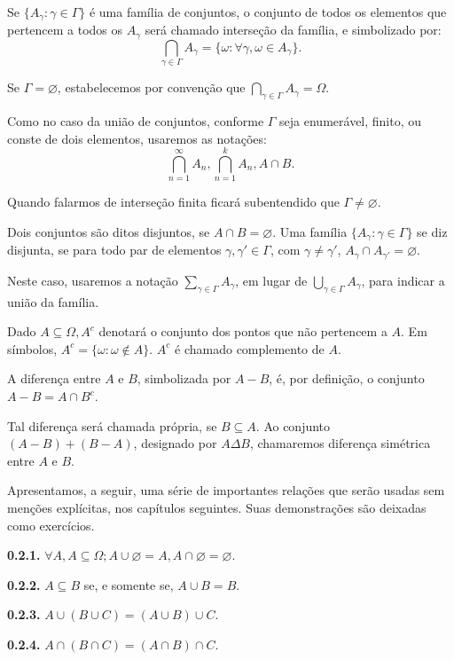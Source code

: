 \documentclass[
]{book}
\begin{document}
Se \(\{A_{\gamma}: \gamma \in \Gamma\}\) é uma família de conjuntos, o conjunto de todos os elementos que pertencem a todos os \(A_{\gamma}\) será chamado interseção da família, e simbolizado por: \[ \bigcap_{\gamma \in \Gamma} A_{\gamma} = \{\omega: \forall \gamma, \omega \in A_{\gamma}\}. \]

Se \(\Gamma = \varnothing\), estabelecemos por convenção que \(\bigcap\limits_{\gamma \in \Gamma} A_{\gamma} = \Omega\).

Como no caso da união de conjuntos, conforme \(\Gamma\) seja enumerável, finito, ou conste de dois elementos, usaremos as notações: \[\bigcap\limits_{n=1}^{\infty} A_n, \bigcap\limits_{n=1}^{k} A_n, A \cap B.\]

Quando falarmos de interseção finita ficará subentendido que \(\Gamma \neq \varnothing\).

Dois conjuntos são ditos disjuntos, se \(A \cap B = \varnothing\).
Uma família \(\{A_{\gamma}: \gamma \in \Gamma\}\) se diz disjunta, se para todo par de elementos \(\gamma, \gamma' \in \Gamma\), com \(\gamma \neq \gamma'\), \(A_{\gamma} \cap A_{\gamma'} = \varnothing\).

Neste caso, usaremos a notação \(\sum\limits_{\gamma \in \Gamma} A_{\gamma}\), em lugar de \(\bigcup\limits_{\gamma \in \Gamma} A_{\gamma}\), para indicar a união da família.

Dado \(A \subseteq \Omega, A^c\) denotará o conjunto dos pontos que não pertencem a \(A\).
Em símbolos, \(A^c = \{\omega: \omega \notin A\}\).
\(A^c\) é chamado complemento de \(A\).

A diferença entre \(A\) e \(B\), simbolizada por \(A-B\), é, por definição, o conjunto \(A-B = A \cap B^c\).

Tal diferença será chamada própria, se \(B \subseteq A\).
Ao conjunto \((A-B) + (B-A)\), designado por \(A \Delta B\), chamaremos diferença simétrica entre \(A\) e \(B\).

Apresentamos, a seguir, uma série de importantes relações que serão usadas sem menções explícitas, nos capítulos seguintes.
Suas demonstrações são deixadas como exercícios.

\textbf{0.2.1.} \(\forall A, A \subseteq \Omega; A \cup \varnothing = A, A \cap \varnothing = \varnothing\).

\textbf{0.2.2.} \(A \subseteq B\) se, e somente se, \(A \cup B = B\).

\textbf{0.2.3.} \(A \cup (B \cup C) = (A \cup B) \cup C\).

\textbf{0.2.4.} \(A \cap (B \cap C) = (A \cap B) \cap C\).
\end{document}
